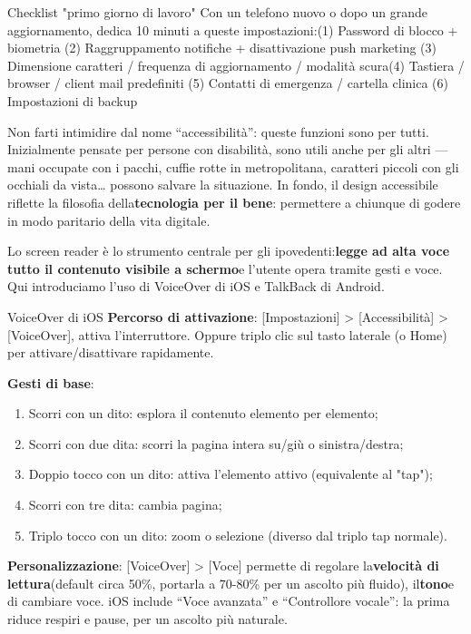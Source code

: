 \begin{tcbinfo}{Checklist "primo giorno di lavoro"}
Con un telefono nuovo o dopo un grande aggiornamento, dedica 10 minuti a queste impostazioni:\newline (1) Password di blocco + biometria (2) Raggruppamento notifiche + disattivazione push marketing (3) Dimensione caratteri / frequenza di aggiornamento / modalità scura\newline (4) Tastiera / browser / client mail predefiniti (5) Contatti di emergenza / cartella clinica (6) Impostazioni di backup

\end{tcbinfo}


Non farti intimidire dal nome “accessibilità”: queste funzioni sono per tutti. Inizialmente pensate per persone con disabilità, sono utili anche per gli altri — mani occupate con i pacchi, cuffie rotte in metropolitana, caratteri piccoli con gli occhiali da vista… possono salvare la situazione. In fondo, il design accessibile riflette la filosofia della\textbf{tecnologia per il bene}: permettere a chiunque di godere in modo paritario della vita digitale.


Lo screen reader è lo strumento centrale per gli ipovedenti:\textbf{legge ad alta voce tutto il contenuto visibile a schermo}e l'utente opera tramite gesti e voce. Qui introduciamo l'uso di VoiceOver di iOS e TalkBack di Android.

\begin{tcbinfo}{VoiceOver di iOS}
\textbf{Percorso di attivazione}: [Impostazioni] > [Accessibilità] > [VoiceOver], attiva l'interruttore. Oppure triplo clic sul tasto laterale (o Home) per attivare/disattivare rapidamente.

\textbf{Gesti di base}:

\begin{enumerate}
  \item Scorri con un dito: esplora il contenuto elemento per elemento;
  \item Scorri con due dita: scorri la pagina intera su/giù o sinistra/destra;
  \item Doppio tocco con un dito: attiva l'elemento attivo (equivalente al "tap");
  \item Scorri con tre dita: cambia pagina;
  \item Triplo tocco con un dito: zoom o selezione (diverso dal triplo tap normale).
\end{enumerate}

\textbf{Personalizzazione}: [VoiceOver] > [Voce] permette di regolare la\textbf{velocità di lettura}(default circa 50\%, portarla a 70-80\% per un ascolto più fluido), il\textbf{tono}e di cambiare voce. iOS include “Voce avanzata” e “Controllore vocale”: la prima riduce respiri e pause, per un ascolto più naturale.

\end{tcbinfo}


